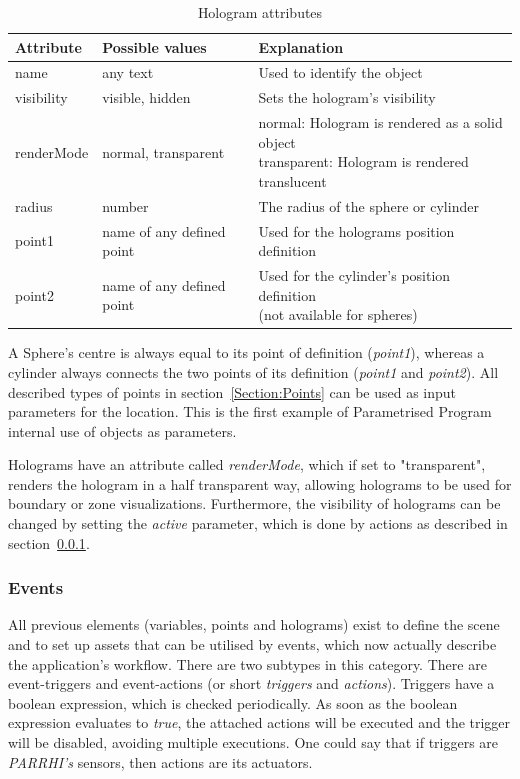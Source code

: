 \begin{table}[!htbp]
	\caption{Hologram attributes}
	\label{Table:HologramAttributes}
	\centering
	\begin{tabular}{lll}
		\toprule
		Attribute & Possible values		& Explanation	\\		
		\midrule
		name & any text & Used to identify the object \\
		visibility & visible, hidden & Sets the hologram's visibility \\
		renderMode & normal, transparent & \parbox[t]{10cm}{ normal: Hologram is rendered as a solid object \\ transparent: Hologram is rendered translucent}\\
		radius & number & The radius of the sphere or cylinder \\
		point1 & name of any defined point & Used for the holograms position definition \\
		point2 & name of any defined point & \parbox[t]{10cm}{ Used for the cylinder's position definition \\ (not available for spheres)} \\
		\bottomrule
	\end{tabular}
\end{table}

A Sphere's centre is always equal to its point of definition (\textit{point1}), whereas a cylinder always connects the two points of its definition (\textit{point1} and \textit{point2}). All described types of points in section~\ref{Section:Points} can be used as input parameters for the location. This is the first example of Parametrised Program internal use of objects as parameters.

Holograms have an attribute called \textit{renderMode}, which if set to "transparent", renders the hologram in a half transparent way, allowing holograms to be used for boundary or zone visualizations. Furthermore, the visibility of holograms can be changed by setting the \textit{active} parameter, which is done by actions as described in section~\ref{Section:Events}.

\subsubsection{Events}\label{Section:Events}
All previous elements (variables, points and holograms) exist to define the scene and to set up assets that can be utilised by events, which now actually describe the application's workflow. There are two subtypes in this category. There are event-triggers and event-actions (or short \textit{triggers} and \textit{actions}). Triggers have a boolean expression, which is checked periodically. As soon as the boolean expression evaluates to \textit{true}, the attached actions will be executed and the trigger will be disabled, avoiding multiple executions. One could say that if triggers are \textit{PARRHI's} sensors, then actions are its actuators.

